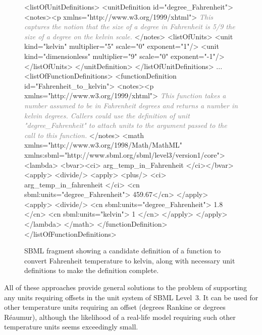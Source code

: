 \begin{figure}
  \begin{example}
<listOfUnitDefinitions>
    <unitDefinition id="degree_Fahrenheit">
        <notes><p xmlns="http://www.w3.org/1999/xhtml">
            \textcolor{gray}{\emph{This captures the notion that the size of a degree in Fahrenheit is 5/9 the size
            of a degree on the kelvin scale.}}
        </notes>
        <listOfUnits>
            <unit kind="kelvin"        multiplier="5" scale="0" exponent="1"/>
            <unit kind="dimensionless" multiplier="9" scale="0" exponent="-1"/>
        </listOfUnits>
    </unitDefinition>
</listOfUnitDefinitions>
...
<listOfFunctionDefinitions>
    <functionDefinition id="Fahrenheit_to_kelvin">
        <notes><p xmlns="http://www.w3.org/1999/xhtml">
            \textcolor{gray}{\emph{This function takes a number assumed to be in Fahrenheit degrees and returns a number
            in kelvin degrees.  Callers could use the definition of unit "degree_Fahrenheit" to
            attach units to the argument passed to the call to this function.}} 
        </notes>
        <math xmlns="http://www.w3.org/1998/Math/MathML"
              xmlns:sbml="http://www.sbml.org/sbml/level3/version1/core">
            <lambda>
                <bvar><ci> arg_temp_in_Fahrenheit </ci></bvar>
                <apply>
                    <divide/>
                    <apply>
                        <plus/>
                        <ci> arg_temp_in_fahrenheit </ci>
                        <cn sbml:units="degree_Fahrenheit"> 459.67</cn>
                    </apply>
                    <apply>
                        <divide/>
                        <cn sbml:units="degree_Fahrenheit"> 1.8 </cn>
                        <cn sbml:units="kelvin"> 1 </cn>
                    </apply>
                </apply>
            </lambda>
        </math>
    </functionDefinition>
</listOfFunctionDefinitions>
\end{example}
\caption{SBML fragment showing a candidate definition of a
  function to convert Fahrenheit temperature to kelvin, along with
  necessary unit definitions to make the definition complete.}
    \label{fig:ftok}
\end{figure}

All of these approaches provide general solutions to the problem
of supporting any units requiring offsets in the unit system of
SBML Level~3.  It can be used for other temperature units
requiring an offset (\eg degrees Rankine or degrees R\'{e}aumur),
although the likelihood of a real-life model requiring such other
temperature units seems exceedingly small.

